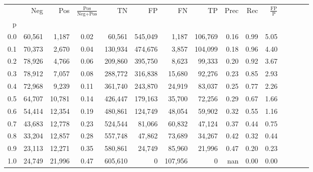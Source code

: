 \begin{tabular}{rrrcrrrrrrrrrrr}
\toprule
{} &     Neg &     Pos & $\frac{\text{Pos}}{\text{Neg}+\text{Pos}}$ &       TN &       FP &       FN &       TP &  Prec &   Rec & $\frac{\text{FP}}{\text{P}}$ \\
p   &         &         &                                            &          &          &          &          &       &       &                              \\
\midrule
0.0 &  60,561 &   1,187 &                                       0.02 &   60,561 &  545,049 &    1,187 &  106,769 &  0.16 &  0.99 &                         5.05 \\
0.1 &  70,373 &   2,670 &                                       0.04 &  130,934 &  474,676 &    3,857 &  104,099 &  0.18 &  0.96 &                         4.40 \\
0.2 &  78,926 &   4,766 &                                       0.06 &  209,860 &  395,750 &    8,623 &   99,333 &  0.20 &  0.92 &                         3.67 \\
0.3 &  78,912 &   7,057 &                                       0.08 &  288,772 &  316,838 &   15,680 &   92,276 &  0.23 &  0.85 &                         2.93 \\
0.4 &  72,968 &   9,239 &                                       0.11 &  361,740 &  243,870 &   24,919 &   83,037 &  0.25 &  0.77 &                         2.26 \\
0.5 &  64,707 &  10,781 &                                       0.14 &  426,447 &  179,163 &   35,700 &   72,256 &  0.29 &  0.67 &                         1.66 \\
0.6 &  54,414 &  12,354 &                                       0.19 &  480,861 &  124,749 &   48,054 &   59,902 &  0.32 &  0.55 &                         1.16 \\
0.7 &  43,683 &  12,778 &                                       0.23 &  524,544 &   81,066 &   60,832 &   47,124 &  0.37 &  0.44 &                         0.75 \\
0.8 &  33,204 &  12,857 &                                       0.28 &  557,748 &   47,862 &   73,689 &   34,267 &  0.42 &  0.32 &                         0.44 \\
0.9 &  23,113 &  12,271 &                                       0.35 &  580,861 &   24,749 &   85,960 &   21,996 &  0.47 &  0.20 &                         0.23 \\
1.0 &  24,749 &  21,996 &                                       0.47 &  605,610 &        0 &  107,956 &        0 &   nan &  0.00 &                         0.00 \\
\bottomrule
\end{tabular}
